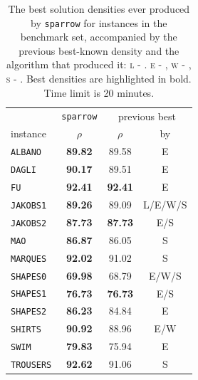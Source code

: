 
\newcommand{\trousersrecord}{92.62}
\newcommand{\shapeszerorecord}{69.98}
\newcommand{\swimrecord}{79.83}
\newcommand{\jakobsonerecord}{89.26}
\newcommand{\shirtsrecord}{90.92}

\begin{table}[!htbp]
    \centering
    \setlength{\tabcolsep}{4pt} %
  \begin{tabular}{|l|c|cc|}
     \hline
  & \texttt{sparrow} & \multicolumn{2}{c|}{previous best} \\
  instance & $\rho$ & $\rho$ & by \\ \hline
  \texttt{ALBANO} & \textbf{89.82} & 89.58 & \tiny{E} \\
  \texttt{DAGLI} & \textbf{90.17} & 89.51 & \tiny{E} \\
  \texttt{FU} & \textbf{92.41} & \textbf{92.41} & \tiny{E} \\
  \texttt{JAKOBS1} & \textbf{\jakobsonerecord} & 89.09 & \tiny{L/E/W/S} \\
  \texttt{JAKOBS2} & \textbf{87.73} & \textbf{87.73} & \tiny{E/S} \\
  \texttt{MAO} & \textbf{86.87} & 86.05 & \tiny{S} \\
  \texttt{MARQUES} & \textbf{92.02} & 91.02 & \tiny{S} \\
  \texttt{SHAPES0} & \textbf{\shapeszerorecord} & 68.79 & \tiny{E/W/S} \\
  \texttt{SHAPES1} & \textbf{76.73} & \textbf{76.73} & \tiny{E/S} \\
  \texttt{SHAPES2} & \textbf{86.23} & 84.84 & \tiny{E} \\
  \texttt{SHIRTS} & \textbf{\shirtsrecord} & 88.96 & \tiny{E/W} \\
  \texttt{SWIM} & \textbf{\swimrecord} & 75.94 & \tiny{E} \\
  \texttt{TROUSERS} & \textbf{\trousersrecord} & 91.06 & \tiny{S} \\
  \hline
  \end{tabular}
  \caption{The best solution densities ever produced by \texttt{sparrow} for instances in the benchmark set, accompanied by the previous best-known density and the algorithm that produced it:
  \textsc{l} - \cite{leung2012extended}.
  \textsc{e} - \cite{elkeran2013new},
  \textsc{w} - \cite{wang2017flexible}, 
  \textsc{s} - \cite{sato2019raster}.
  Best densities are highlighted in bold.
  Time limit is 20 minutes.
  }
\label{tab:best}
\end{table}